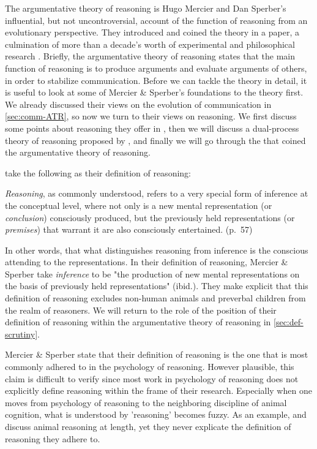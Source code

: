 The argumentative theory of reasoning is Hugo Mercier and Dan Sperber's influential, but not uncontroversial, account of the function of reasoning from an evolutionary perspective. They introduced and coined the theory in a \citeyear{MS11} paper, a culmination of more than a decade's worth of experimental and philosophical research \citep{Sperber01, Sperber10, MS09, Sperber00}.
Briefly, the argumentative theory of reasoning states that the main function of reasoning is to produce arguments and evaluate arguments of others, in order to stabilize communication.
Before we can tackle the theory in detail, it is useful to look at some of Mercier \& Sperber's foundations to the theory first. We already discussed their views on the evolution of communication in \cref{sec:comm-ATR}, so now we turn to their views on reasoning. We first discuss some points about reasoning they offer in \citet{Sperber01,Sperber10}, then we will discuss a dual-process theory of reasoning proposed by \citet{MS09}, and finally we will go through the \citeyear{MS11} that coined the argumentative theory of reasoning.

\citet{MS11} take the following as their definition of reasoning:

\begin{quoting}
    \emph{Reasoning}, as commonly understood, refers to a very special form of inference at the conceptual level, where not only is a new mental representation (or \emph{conclusion}) consciously produced, but the previously held representations (or \emph{premises}) that warrant it are also consciously entertained.
    \hfill (p.~57)
\end{quoting}
In other words, that what distinguishes reasoning from inference is the conscious attending to the representations.
In their definition of reasoning, Mercier \& Sperber take \emph{inference} to be "the production of new mental representations on the basis of previously held representations" (ibid.). They make explicit that this definition of reasoning excludes non-human animals and preverbal children from the realm of reasoners.
We will return to the role of the position of their definition of reasoning within the argumentative theory of reasoning in \cref{sec:def-scrutiny}.

Mercier \& Sperber state that their definition of reasoning is the one that is most commonly adhered to in the psychology of reasoning. However plausible, this claim is difficult to verify since most work in psychology of reasoning does not explicitly define reasoning within the frame of their research. Especially when one moves from psychology of reasoning to the neighboring discipline of animal cognition, what is understood by 'reasoning' becomes fuzzy. As an example, \citet{Andrews15} and \citet{Call06} discuss animal reasoning at length, yet they never explicate the definition of reasoning they adhere to.


